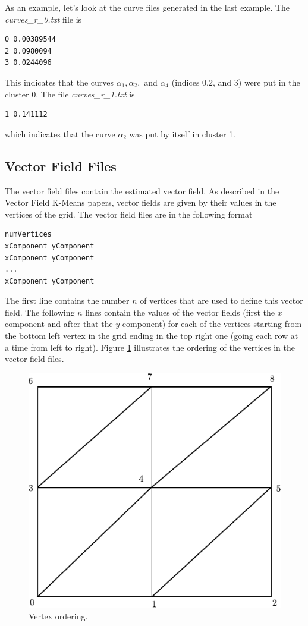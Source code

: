\documentclass[10pt]{article}
\begin{document}
As an example, let's look at the curve files generated in the last example. The 
\emph{curves\_r\_0.txt} file is 

\begin{lstlisting}
0 0.00389544
2 0.0980094
3 0.0244096
\end{lstlisting}

This indicates that the curves $\alpha_1, \alpha_2,$ and $\alpha_4$ (indices 0,2, and 3) 
were put in the cluster 0. The file \emph{curves\_r\_1.txt} is

\begin{lstlisting}
1 0.141112
\end{lstlisting}

which indicates that the curve $\alpha_2$ was put by itself in cluster 1.

\subsection{Vector Field Files}

The vector field files contain the estimated vector field. As described in
the Vector Field K-Means papers, vector fields are given by their values in
the vertices of the grid. The vector field files are in the following format

\begin{lstlisting}
numVertices
xComponent yComponent
xComponent yComponent
...
xComponent yComponent
\end{lstlisting}

The first line contains the number $n$ of vertices that are used to define this vector field.
The following $n$ lines contain the values of the vector fields (first the $x$ component and
after that the $y$ component) for each of the vertices starting from the bottom left vertex
in the grid ending in the top right one (going each row at a time from left to right). Figure
\ref{figs:vertex_ordering} illustrates the ordering of the vertices in the vector field files.

\begin{figure}[!h]
\centerline{\includegraphics[width=0.5\linewidth]{figs/vertex_ordering.pdf}}
\caption{Vertex ordering.}
\label{figs:vertex_ordering}
\end{figure}
\end{document}
